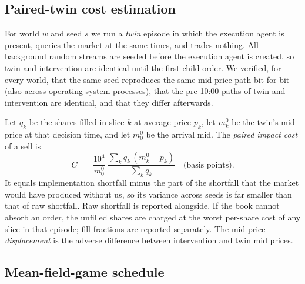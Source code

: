 \subsection{Paired-twin cost estimation}

For world $w$ and seed $s$ we run a \emph{twin} episode in which the execution agent is present, queries the market at the same times, and trades nothing. All background random streams are seeded before the execution agent is created, so twin and intervention are identical until the first child order. We verified, for every world, that the same seed reproduces the same mid-price path bit-for-bit (also across operating-system processes), that the pre-10:00 paths of twin and intervention are identical, and that they differ afterwards.

Let $q_k$ be the shares filled in slice $k$ at average price $p_k$, let $m^{0}_k$ be the twin's mid price at that decision time, and let $m^{0}_0$ be the arrival mid. The \emph{paired impact cost} of a sell is
\begin{equation}
C \;=\; \frac{10^4}{m^0_0}\;\frac{\sum_k q_k\,(m^{0}_k - p_k)}{\sum_k q_k}\quad\text{(basis points)}.
\label{eq:cost}
\end{equation}
It equals implementation shortfall minus the part of the shortfall that the market would have produced without us, so its variance across seeds is far smaller than that of raw shortfall. Raw shortfall is reported alongside. If the book cannot absorb an order, the unfilled shares are charged at the worst per-share cost of any slice in that episode; fill fractions are reported separately. The mid-price \emph{displacement} is the adverse difference between intervention and twin mid prices.

\subsection{Mean-field-game schedule}
\label{sec:mfgmodel}

